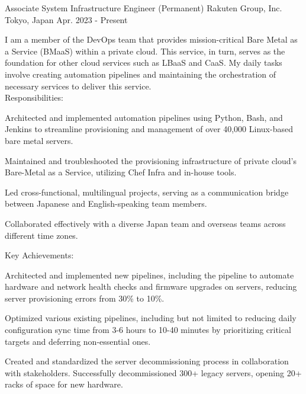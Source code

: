 

\begin{cventries}

  \cventry
    {Associate System Infrastructure Engineer (Permanent)} %
    {Rakuten Group, Inc.} %
    {Tokyo, Japan} %
    {Apr. 2023 - Present} %
    {
      \begin{cvjobdesc} %
        I am a member of the DevOps team that provides mission-critical Bare Metal as a Service (BMaaS) within a private cloud. This service, in turn, serves as the foundation for other cloud services such as LBaaS and CaaS. My daily tasks involve creating automation pipelines and maintaining the orchestration of necessary services to deliver this service.
        \vspace{2.0mm}
        \\Responsibilities:
        \begin{cvbullets}
        \item {Architected and implemented automation pipelines using Python, Bash, and Jenkins to streamline provisioning and management of over 40,000 Linux-based bare metal servers.}
        \item {Maintained and troubleshooted the provisioning infrastructure of private cloud’s Bare-Metal as a Service, utilizing Chef Infra and in-house tools.}
        \item {Led cross-functional, multilingual projects, serving as a communication bridge between Japanese and English-speaking team members.}
        \item {Collaborated effectively with a diverse Japan team and overseas teams across different time zones.}
        \end{cvbullets}
        \vspace{2.0mm}
        Key Achievements:
        \begin{cvbullets}
        \item {Architected and implemented new pipelines, including the pipeline to automate hardware and network health checks and firmware upgrades on servers, reducing server provisioning errors from 30\% to 10\%.}
        \item {Optimized various existing pipelines, including but not limited to reducing daily configuration sync time from 3-6 hours to 10-40 minutes by prioritizing critical targets and deferring non-essential ones.}
        \item {Created and standardized the server decommissioning process in collaboration with stakeholders. Successfully decommissioned 300+ legacy servers, opening 20+ racks of space for new hardware.}
        \end{cvbullets}
      \end{cvjobdesc}
    }


\end{cventries}
